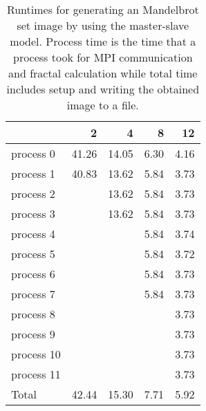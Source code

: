 \documentclass[a4paper]{article}
\begin{document}
\begin{table}[h]
	\centering
	\caption{Runtimes for generating an Mandelbrot set image by using the master-slave model. Process time is the time that a process took for MPI communication and fractal calculation while total time includes setup and writing the obtained image to a file.}
	\label{tbl:mandelbrot}
	\begin{tabular}{l|r|r|r|r}
		 & 2 & 4 & 8 & 12 \\ \hline
		process 0  & 41.26 & 14.05 & 6.30 & 4.16 \\
		process 1  & 40.83 & 13.62 & 5.84 & 3.73 \\
		process 2  &       & 13.62 & 5.84 & 3.73 \\
		process 3  &       & 13.62 & 5.84 & 3.73 \\
		process 4  &       &       & 5.84 & 3.74 \\
		process 5  &       &       & 5.84 & 3.72 \\
		process 6  &       &       & 5.84 & 3.73 \\
		process 7  &       &       & 5.84 & 3.73 \\
		process 8  &       &       &      & 3.73 \\
		process 9  &       &       &      & 3.73 \\
		process 10 &       &       &      & 3.73 \\
		process 11 &       &       &      & 3.73 \\ \hline
		Total      & 42.44 & 15.30 & 7.71 & 5.92
	\end{tabular}
\end{table}
\end{document}
